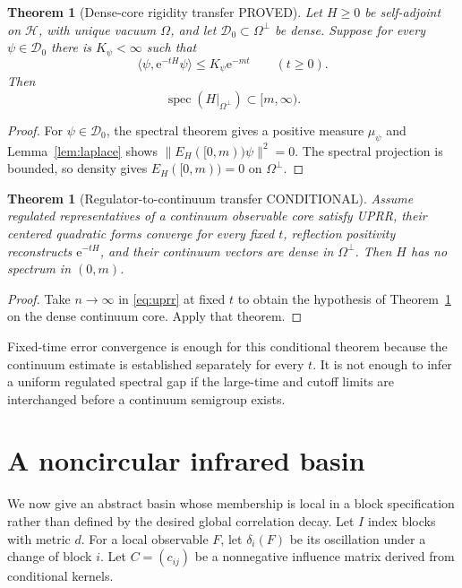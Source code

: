 \documentclass[11pt]{article}
\newcommand{\Pstatus}{\textcolor{proved}{\textsf{PROVED}}}
\newcommand{\Cstatus}{\textcolor{conditional}{\textsf{CONDITIONAL}}}
\newcommand{\spec}{\operatorname{spec}}
\newcommand{\e}{\mathrm e}
\newtheorem{theorem}[definition]{Theorem}
\theoremstyle{remark}
\begin{document}
\begin{theorem}[Dense-core rigidity transfer \Pstatus]\label{thm:transfer}
Let $H\ge0$ be self-adjoint on $\mathcal H$, with unique vacuum $\Omega$, and
let $\mathcal D_0\subset\Omega^\perp$ be dense.  Suppose for every
$\psi\in\mathcal D_0$ there is $K_\psi<\infty$ such that
\[
 \langle\psi,\e^{-tH}\psi\rangle
 \le K_\psi\e^{-mt}\qquad(t\ge0).
\]
Then
\[
 \spec(H|_{\Omega^\perp})\subset[m,\infty).
\]
\end{theorem}

\begin{proof}
For $\psi\in\mathcal D_0$, the spectral theorem gives a positive measure
$\mu_\psi$ and Lemma~\ref{lem:laplace} shows
$\|E_H([0,m))\psi\|^2=0$.  The spectral projection is bounded, so density gives
$E_H([0,m))=0$ on $\Omega^\perp$.
\end{proof}

\begin{theorem}[Regulator-to-continuum transfer \Cstatus]\label{thm:regcont}
Assume regulated representatives of a continuum observable core satisfy UPRR,
their centered quadratic forms converge for every fixed $t$, reflection
positivity reconstructs $\e^{-tH}$, and their continuum vectors are dense in
$\Omega^\perp$.  Then $H$ has no spectrum in $(0,m)$.
\end{theorem}

\begin{proof}
Take $n\to\infty$ in \eqref{eq:uprr} at fixed $t$ to obtain the hypothesis of
Theorem~\ref{thm:transfer} on the dense continuum core.  Apply that theorem.
\end{proof}

Fixed-time error convergence is enough for this conditional theorem because
the continuum estimate is established separately for every $t$.  It is not
enough to infer a uniform regulated spectral gap if the large-time and cutoff
limits are interchanged before a continuum semigroup exists.

\section{A noncircular infrared basin}

We now give an abstract basin whose membership is local in a block
specification rather than defined by the desired global correlation decay.
Let $I$ index blocks with metric $d$.  For a local observable $F$, let
$\delta_i(F)$ be its oscillation under a change of block $i$.  Let
$C=(c_{ij})$ be a nonnegative influence matrix derived from conditional kernels.
\end{document}
